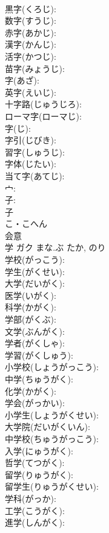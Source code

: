 \documentclass[8pt]{extreport}
\begin{document}
\begin{CJK}{UTF8}{min}
\\	黒字(くろじ): 
\\	数字(すうじ): 
\\	赤字(あかじ): 
\\	漢字(かんじ): 
\\	活字(かつじ): 
\\	苗字(みょうじ): 
\\	字(あざ): 
\\	英字(えいじ): 
\\	十字路(じゅうじろ): 
\\	ローマ字(ローマじ): 
\\	字(じ): 
\\	字引(じびき): 
\\	習字(しゅうじ): 
\\	字体(じたい): 
\\	当て字(あてじ): 
\\	宀: 
\\	子: 
\\	子	
\\	こ・こへん	
\\	会意 
\\	学	ガク	まな.ぶ	たか, のり	
\\	学校(がっこう): 
\\	学生(がくせい): 
\\	大学(だいがく): 
\\	医学(いがく): 
\\	科学(かがく): 
\\	学部(がくぶ): 
\\	文学(ぶんがく): 
\\	学者(がくしゃ): 
\\	学習(がくしゅう): 
\\	小学校(しょうがっこう): 
\\	中学(ちゅうがく): 
\\	化学(かがく): 
\\	学会(がっかい): 
\\	小学生(しょうがくせい): 
\\	大学院(だいがくいん): 
\\	中学校(ちゅうがっこう): 
\\	入学(にゅうがく): 
\\	哲学(てつがく): 
\\	留学(りゅうがく): 
\\	留学生(りゅうがくせい): 
\\	学科(がっか): 
\\	工学(こうがく): 
\\	進学(しんがく): 

\end{CJK}
\end{document}
